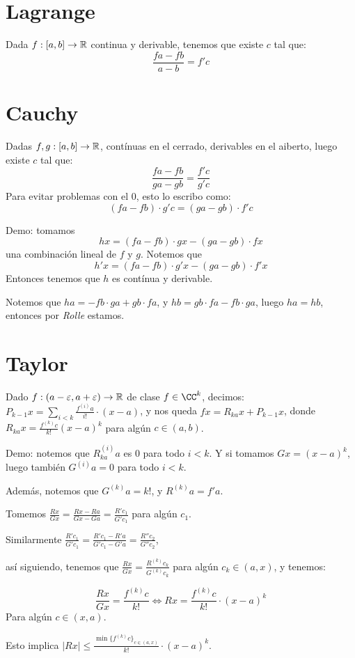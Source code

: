 \documentclass{article}
\begin{document}
\section*{Lagrange}
Dada $f: [a, b] \to \mathbb{R}$ continua y derivable, tenemos que existe $c$ tal que:
\[
	\frac{fa - fb}{a-b}  = f'c
\]
\section*{Cauchy}
Dadas $f, g: [a,b] \to \mathbb{R}$, contínuas en el cerrado, derivables en el aiberto,
luego existe $c$ tal que:
\[
	\frac{fa-fb}{ga - gb} = \frac{f'c}{g'c} 
\]
Para evitar problemas con el $0$, esto lo escribo como:
\[
	(fa-fb) \cdot g'c = (ga - gb) \cdot f'c
\]

Demo: tomamos \[hx = 
	(fa-fb) \cdot gx - (ga - gb) \cdot fx
	\]una combinación lineal de $f$ y $g$. Notemos que \[
	h'x = (fa-fb) \cdot g'x - (ga - gb) \cdot f'x
\]
Entonces tenemos que $h$ es contínua y derivable.

Notemos que $ha = -fb \cdot ga + gb \cdot fa$, y $hb = gb \cdot fa - fb \cdot
ga$, luego $ha = hb$, entonces por \emph{Rolle} estamos.

\section{Taylor}
Dado $f: (a-\varepsilon, a+\varepsilon) \to \mathbb{R}$ de clase $f \in \CC^k$, decimos:
$P_{k-1}x = \sum_{i < k} \frac{f^{(i)}a}{i!}  \cdot (x-a)$, y nos queda
$fx = R_{ka}x + P_{k-1}x$, donde
$R_{ka}x = \frac{f^{(k)}c}{k!}(x-a)^k$ para algún $c \in (a, b)$.

Demo: notemos que $R_{ka}^{(i)}a$ es $0$ para todo $i < k$. Y si tomamos
$Gx = (x-a)^k$, luego también $G^{(i)}a = 0$ para todo $i < k$.

Además, notemos que $G^{(k)}a = k!$, y $R^{(k)}a = f'a$.

Tomemos $\frac{Rx}{Gx} = \frac{Rx - Ra}{Gx-Ga} = \frac{R'c_1}{G'c_1} $ para
algún $c_1$.

Similarmente $\frac{R'c_1}{G'c_1} = \frac{R'c_1 - R'a}{G'c_1-G'a} =
\frac{R''c_2}{G''c_2} $,

así siguiendo, tenemos que $\frac{Rx}{Gx} = \frac{R^{(k)}c_k}{G^{(k)}c_k}$ para
algún $c_k \in (a, x)$, y tenemos:

\[
	\frac{Rx}{Gx} = \frac{f^{(k)}c}{k!} \iff Rx = \frac{f^{(k)}c}{k!} \cdot
	(x-a)^k
\]
Para algún $c \in (x, a)$.

Esto implica $|Rx| \leq \frac{\min \{f^{(k)}c\}_{c \in (a,x)}}{k!} \cdot
(x-a)^k$.
\end{document}
